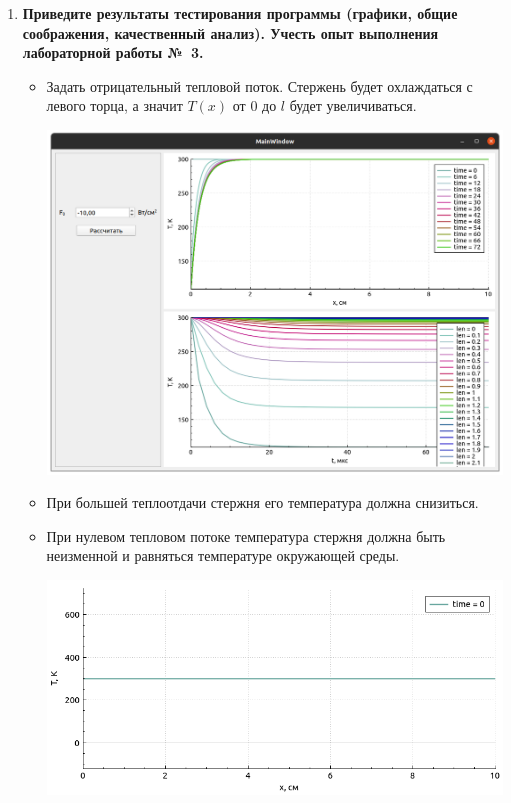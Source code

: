 \documentclass[a4paper,oneside,12pt]{extreport}
\begin{document}
\begin{enumerate}
	\item
	\textbf{
		Приведите результаты тестирования программы (графики, общие соображения, качественный анализ).
		Учесть опыт выполнения лабораторной работы №~3.
	}

	\begin{itemize}
		\item Задать отрицательный тепловой поток.
		Стержень будет охлаждаться с левого торца, а значит $T(x)$ от $0$ до $l$ будет увеличиваться.

		\includegraphics[width=\linewidth]{inc/img/graph3}

		\item При большей теплоотдачи стержня его температура должна снизиться.

		\item При нулевом тепловом потоке температура стержня должна быть неизменной и равняться температуре окружающей среды.

		\includegraphics[width=\linewidth]{inc/img/graph2-1}


\end{itemize}
\end{enumerate}
\end{document}
